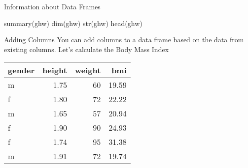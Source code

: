 \documentclass[
  ignorenonframetext,
]{beamer}
\newenvironment{Shaded}{\begin{snugshade}}{\end{snugshade}}
\newcommand{\DecValTok}[1]{\textcolor[rgb]{0.00,0.00,0.81}{#1}}
\newcommand{\FunctionTok}[1]{\textcolor[rgb]{0.00,0.00,0.00}{#1}}
\newcommand{\NormalTok}[1]{#1}
\newcommand{\OtherTok}[1]{\textcolor[rgb]{0.56,0.35,0.01}{#1}}
\newcommand{\SpecialCharTok}[1]{\textcolor[rgb]{0.00,0.00,0.00}{#1}}
\begin{document}
\begin{frame}[fragile]{Information about Data Frames}
\protect\hypertarget{information-about-data-frames}{}
\begin{Shaded}
\begin{Highlighting}[]
\FunctionTok{summary}\NormalTok{(ghw)}
\FunctionTok{dim}\NormalTok{(ghw)}
\FunctionTok{str}\NormalTok{(ghw)}
\FunctionTok{head}\NormalTok{(ghw)}
\end{Highlighting}
\end{Shaded}
\end{frame}

\begin{frame}{Adding Columns}
\protect\hypertarget{adding-columns}{}
You can add columns to a data frame based on the data from existing
columns. Let's calculate the Body Mass Index
\end{frame}

\begin{frame}[fragile]
\begin{Shaded}
\end{Shaded}

\begin{longtable}[]{@{}lrrr@{}}
\toprule()
gender & height & weight & bmi \\
\midrule()
\endhead
m & 1.75 & 60 & 19.59 \\
f & 1.80 & 72 & 22.22 \\
m & 1.65 & 57 & 20.94 \\
f & 1.90 & 90 & 24.93 \\
f & 1.74 & 95 & 31.38 \\
m & 1.91 & 72 & 19.74 \\
\bottomrule()
\end{longtable}
\end{frame}
\end{document}
